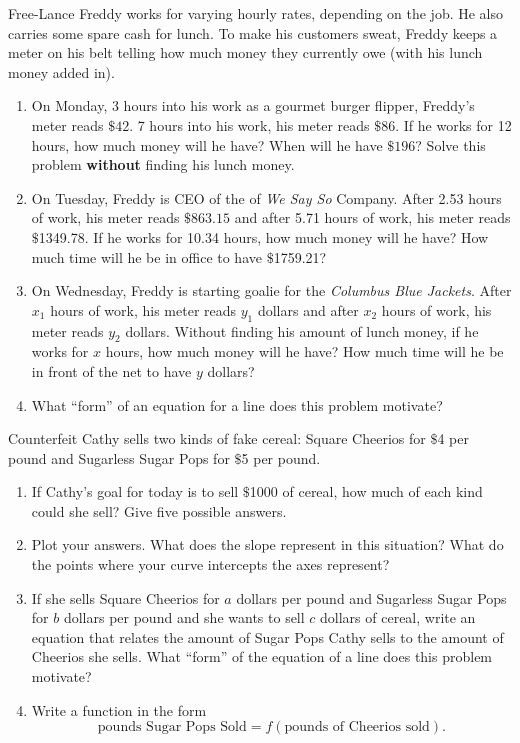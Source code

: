 \begin{prob}
Free-Lance Freddy works for varying hourly rates, depending on the
job.  He also carries some spare cash for lunch.  To make his
customers sweat, Freddy keeps a meter on his belt telling how much
money they currently owe (with his lunch money added in).
\begin{enumerate}
\item On Monday, 3 hours into his work as a gourmet burger flipper,
  Freddy's meter reads $\$42$. 7 hours into his work, his meter reads
  $\$86$.  If he works for 12 hours, how much money will he have?  When
  will he have $\$196$? Solve this problem \textbf{without} finding his
  lunch money.
\item On Tuesday, Freddy is CEO of the of \textit{We Say So} Company.
  After 2.53 hours of work, his meter reads $\$863.15$ and after 5.71
  hours of work, his meter reads $\$$1349.78.  If he works for 10.34
  hours, how much money will he have?  How much time will he be in
  office to have $\$$1759.21?
\item On Wednesday, Freddy is starting goalie for the \textit{Columbus
  Blue Jackets}. After $x_1$ hours of work, his meter reads $y_1$
  dollars and after $x_2$ hours of work, his meter reads $y_2$
  dollars. Without finding his amount of lunch money, if he works for
  $x$ hours, how much money will he have?  How much time will he be in
  front of the net to have $y$ dollars?
\item What ``form'' of an equation for a line does this problem
  motivate?
\end{enumerate}
\end{prob}

\begin{prob} 
Counterfeit Cathy sells two kinds of fake cereal: Square Cheerios for
$\$$4 per pound and Sugarless Sugar Pops for $\$$5 per pound.

\begin{enumerate}
\item If Cathy's goal for today is to sell $\$$1000 of cereal, how
  much of each kind could she sell? Give five possible answers.
\item Plot your answers.  What does the slope represent in this
  situation? What do the points where your curve intercepts the axes
  represent?
\item If she sells Square Cheerios for $a$ dollars per pound and
  Sugarless Sugar Pops for $b$ dollars per pound and she wants to sell
  $c$ dollars of cereal, write an equation that relates the amount of
  Sugar Pops Cathy sells to the amount of Cheerios she sells.  What
  ``form'' of the equation of a line does this problem motivate?
\item Write a function in the form 
\[
\text{pounds Sugar Pops Sold} = f(\text{pounds of Cheerios sold}).
\]
\end{enumerate}
\end{prob}


